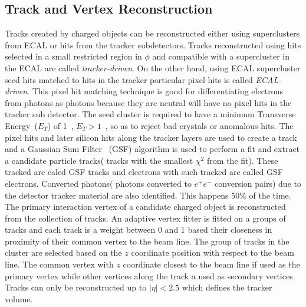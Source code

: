 \subsection{Track and Vertex Reconstruction}
Tracks created by charged objects can be reconstructed either using superclusters from ECAL or hits from the tracker subdetectors.
Tracks reconstructed using hits selected in a small restricted region in $\phi$ and compatible with a supercluster in the ECAL are
called \textit{tracker-driven}. On the other hand, using ECAL supercluster seed hits matched to hits in the tracker particular pixel  hits is called \textit{ECAL-driven}. This pixel hit matching technique is good for differentiating electrons from photons as photons because they are neutral will have no pixel hits in the tracker sub detector. The seed cluster is required to have a minimum Transverse Energy~($E_{T}$)  of  1~\GeV, $E_{T} > 1$~\GeV, so as to reject bad crystals or anomalous hits.
The pixel hits and later silicon hits along the tracker layers are used to create a track and a Gaussian Sum Filter ~(GSF) algorithm is used to perform a fit and extract a candidate particle tracks( tracks with the smallest $\chi^{2}$ from the fit). These tracked are caled GSF tracks and electrons with such tracked are called GSF electrons. Converted photons( photons converted to $e^{+}e^{-}$ conversion pairs) due to the detector  tracker material are also identified. This happens 50\% of the time.
\newline
The primary interaction vertex of a candidate charged object is reconstructed from the collection of tracks.
An adaptive vertex fitter is fitted on a groups of tracks and each track is a weight between 0 and 1 based their closeness in proximity of their common vertex to the beam line. The group of tracks in the cluster are selected based on the $z$ coordinate position with respect to the beam line. The common vertex with $z$ coordinate closest to the beam line if used as the primary vertex while other vertices along the track a used as secondary vertices. Tracks can only be reconstructed up to $|\eta| < 2.5$ which defines the tracker volume.
